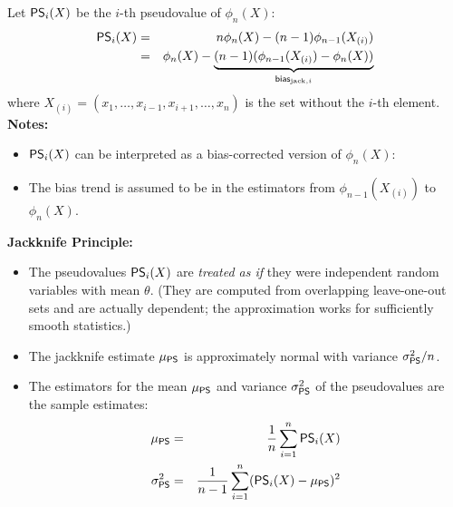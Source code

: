   Let ${\mathop{\mathsf{PS}}}_i(X)$ be the $i$-th pseudovalue of $\phi_n(X)$:
  \begin{eqnarray*}
    {\mathop{\mathsf{PS}}}_i(X) 
      &=& n \phi_n(X) - (n-1) \phi_{n-1}(X_{(i)}) \\
      &=& \phi_n(X) - \underbrace{(n-1)( \phi_{n-1}(X_{(i)}) - \phi_n(X))}_{\mathsf{bias}_{\text{jack},i}}
  \end{eqnarray*}
  where $X_{(i)} = (x_1, \ldots, x_{i-1}, x_{i+1}, \ldots, x_n)$ is the set without the $i$-th element.\\
 \textbf {Notes:}
  \begin{itemize}
    \item ${\mathop{\mathsf{PS}}}_i(X)$ can be interpreted as a bias-corrected version of $\phi_n(X)$:        
    \item The bias trend is assumed to be in the estimators from $\phi_{n-1}(X_{(i)})$ to $\phi_n(X)$.
  \end{itemize}
 \textbf {Jackknife Principle:}
  \begin{itemize}
    \item The pseudovalues ${\mathop{\mathsf{PS}}}_i(X)$ are \emph{treated as if} they were independent random variables with mean $\theta$. (They are computed from overlapping leave-one-out sets and are actually dependent; the approximation works for sufficiently smooth statistics.)
    \item The jackknife estimate $\mu_{{\mathop{\mathsf{PS}}}}$ is approximately normal with variance $\sigma^2_{{\mathop{\mathsf{PS}}}}/n$.
    \item The estimators for the mean $\mu_{{\mathop{\mathsf{PS}}}}$ and variance $\sigma_{{\mathop{\mathsf{PS}}}}^2$ of the pseudovalues are the sample estimates:
      \begin{eqnarray*}
        \mu_{{\mathop{\mathsf{PS}}}}      &=& \frac{1}{n} \sum_{i=1}^n {\mathop{\mathsf{PS}}}_i(X) \\
        \sigma_{{\mathop{\mathsf{PS}}}}^2 &=& \frac{1}{n-1} \sum_{i=1}^n ({\mathop{\mathsf{PS}}}_i(X) - \mu_{{\mathop{\mathsf{PS}}}})^2
      \end{eqnarray*}
  \end{itemize}
 
